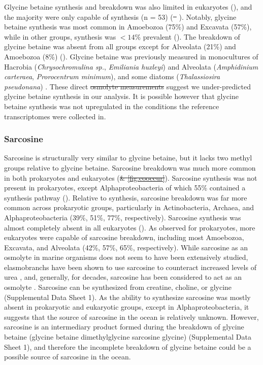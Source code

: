 \documentclass[utf8]{frontiersSCNS} %
\providecommand{\DIFaddtex}[1]{{\protect\color{blue}\uwave{#1}}} %
\providecommand{\DIFdeltex}[1]{{\protect\color{red}\sout{#1}}}                      %
\providecommand{\DIFaddbegin}{} %
\providecommand{\DIFaddend}{} %
\providecommand{\DIFdelbegin}{} %
\providecommand{\DIFdelend}{} %
\providecommand{\DIFadd}[1]{\texorpdfstring{\DIFaddtex{#1}}{#1}} %
\providecommand{\DIFdel}[1]{\texorpdfstring{\DIFdeltex{#1}}{}} %
\begin{document}
Glycine betaine synthesis and breakdown was also limited in eukaryotes (), and the majority were only capable of synthesis (n = 53) (\DIFdelbegin \DIFdel{\mbox{%
}%
}\DIFdelend \DIFaddbegin \DIFadd{\mbox{%
}%
}\DIFaddend ). Notably, glycine betaine synthesis was most common in Amoebozoa (75\%) and Excavata (57\%), while in other groups, synthesis was $< 14\%$ prevalent (). The breakdown of glycine betaine was absent from all groups except for Alveolata (21\%) and Amoebozoa (8\%) (). Glycine betaine was previously measured in monocultures of Hacrobia (\textit{Chrysochromulina sp.}, \textit{Emiliania huxleyi}) and Alveolata (\textit{Amphidinium carteraea}, \textit{Prorocentrum minimum}), and some diatoms (\textit{Thalassiosira pseudonana}) \citep{Gebser2013,Keller1999,Keller1999.2}. These direct \DIFdelbegin \DIFdel{osmolyte measurements }\DIFdelend \DIFaddbegin \DIFadd{measurements of cellular osmolytes }\DIFaddend suggest we under-predicted glycine betaine synthesis in our analysis. It is possible however that glycine betaine synthesis was not upregulated in the conditions the reference transcriptomes were collected in. 

\subsubsection*{Sarcosine}
Sarcosine is structurally very similar to glycine betaine, but it lacks two methyl groups relative to glycine betaine. Sarcosine breakdown was much more common in both prokaryotes and eukaryotes (\DIFdelbegin \DIFdel{\& \ref{fig:cooccur}}\DIFdelend ). Sarcosine synthesis was not present in prokaryotes, except Alphaproteobacteria of which 55\% contained a synthesis pathway (). Relative to synthesis, sarcosine breakdown was far more common across prokaryotic groups, particularly in Actinobacteria, Archaea, and Alphaproteobacteria (39\%, 51\%, 77\%, respectively). Sarcosine synthesis was almost completely absent in all eukaryotes (). As observed for prokaryotes, more eukaryotes were capable of sarcosine breakdown, including most Amoebozoa, Excavata, and Alveolata (42\%, 57\%, 65\%, respectively). While sarcosine as an osmolyte in marine organisms does not seem to have been extensively studied, elasmobranchs have been shown to use sarcosine to counteract increased levels of urea \citep{Treberg2006}, and, generally, for decades, sarcosine has been considered to act as an osmolyte \citep{Arakawa1985}. Sarcosine can be synthesized from creatine, choline, or glycine (Supplemental Data Sheet 1). As the ability to synthesize sarcosine was mostly absent in prokaryotic and eukaryotic groups, except in Alphaproteobacteria, it suggests that the source of sarcosine in the ocean is relatively unknown. However, sarcosine is an intermediary product formed during the breakdown of glycine betaine (glycine betaine \textrightarrow dimethylglycine \textrightarrow  sarcosine \textrightarrow glycine) (Supplemental Data Sheet 1), and therefore the incomplete breakdown of glycine betaine could be a possible source of sarcosine in the ocean.
\end{document}
